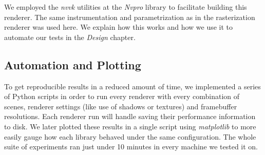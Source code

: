 We employed the \textit{nvvk} utilities at the \textit{Nvpro} library \cite{Nvpro} to facilitate building this renderer. The same instrumentation and parametrization as in the rasterization renderer was used here. We explain how this works and how we use it to automate our tests in the \textit{Design} chapter.


\clearpage
\subsection{Automation and Plotting}
To get reproducible results in a reduced amount of time, we implemented a series of Python scripts in order to run every renderer with every combination of scenes, renderer settings (like use of shadows or textures) and framebuffer resolutions. Each renderer run will handle saving their performance information to disk. We later plotted these results in a single script using \textit{matplotlib} to more easily gauge how each library behaved under the same configuration. The whole suite of experiments ran just under 10 minutes in every machine we tested it on.
